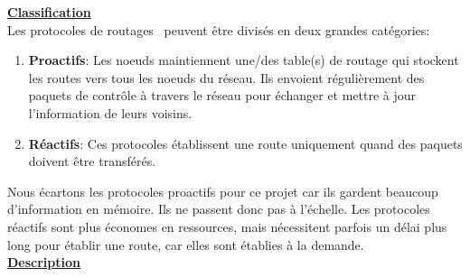     \underline{\textbf{Classification}}\\

    Les protocoles de routages \mesh\ peuvent être divisés en deux grandes catégories:
    \begin{enumerate}
        \item \textbf{Proactifs}: Les noeuds maintiennent une/des table(s) de routage
            qui stockent les routes vers tous les noeuds du réseau. 
            Ils envoient régulièrement des paquets de contrôle à travers le réseau pour échanger et 
            mettre à jour l'information de leurs voisins.
        \item \textbf{Réactifs}: Ces protocoles établissent une route uniquement quand des paquets
            doivent être transférés.
    \end{enumerate}
    Nous écartons les protocoles proactifs pour ce projet car ils gardent
    beaucoup d'information en mémoire. Ils ne passent donc pas à l'échelle.
    Les protocoles réactifs sont plus économes en ressources, mais nécessitent parfois un délai
    plus long pour établir une route, car elles sont établies à la demande.\\

    \underline{\textbf{Description}}\\

